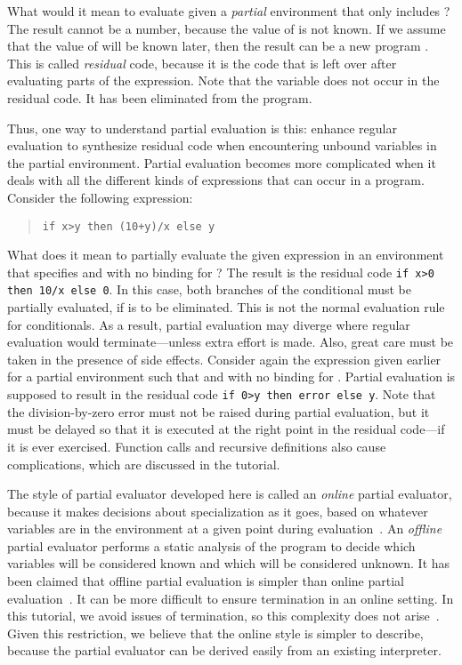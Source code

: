 \documentclass{eptcs}
\begin{document}
What would it mean to evaluate  given a \textit{partial}
environment that only includes ?  The result cannot be a number,
because the value of  is not known.  If we assume that the value of
 will be known later, then the result can be a new program
. This is called \textit{residual} code, because it is the code
that is left over after evaluating parts of the expression. Note that
the variable  does not occur in the residual code. It has been
eliminated from the program.

Thus, one way to understand partial evaluation is this: enhance
regular evaluation to synthesize residual code when encountering
unbound variables in the partial environment. Partial evaluation
becomes more complicated when it deals with all the different kinds of
expressions that can occur in a program. Consider the following 
expression:

\begin{quote}
\lstinline{if x>y then (10+y)/x else y} 
\end{quote}

\noindent
What does it mean to partially evaluate the given expression in an
environment that specifies  and with no binding for ? The
result is the residual code \lstinline{if x>0 then 10/x else 0}. In
this case, both branches of the conditional must be partially
evaluated, if  is to be eliminated. This is not the normal
evaluation rule for conditionals.  As a result, partial evaluation may
diverge where regular evaluation would terminate---unless extra effort
is made. Also, great care must be taken in the presence of side
effects. Consider again the expression given earlier for a partial
environment such that  and with no binding for . Partial
evaluation is supposed to result in the residual code
\lstinline{if 0>y then error else y}. Note that the division-by-zero
error must not be raised during partial evaluation, but it must be
delayed so that it is executed at the right point in the residual
code---if it is ever exercised. Function calls and recursive
definitions also cause complications, which are discussed in the
tutorial.

The style of partial evaluator developed here is called an
\textit{online} partial evaluator, because it makes decisions about
specialization as it goes, based on whatever variables are in the
environment at a given point during evaluation~\cite{PartialEvalBookGomard}.  
An \textit{offline}
partial evaluator performs a static analysis of the program to decide
which variables will be considered known and which will be considered
unknown. It has been claimed 
that offline partial evaluation is simpler than online partial
evaluation~\cite{Thiemann95}. It can be more difficult to ensure 
termination in an online setting. In this tutorial, we avoid issues
of termination, so this complexity does not arise~\cite{Shali2011}.
Given this restriction, we believe that the online style is
simpler to describe, because the partial evaluator can be derived easily from an
existing interpreter.
\end{document}
